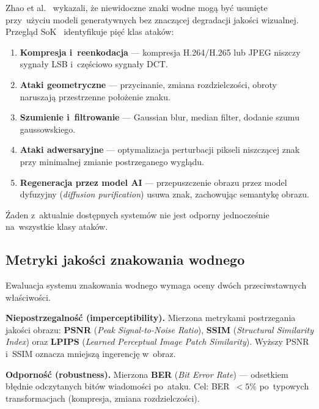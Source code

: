 Zhao et al.\ \cite{Zhao2023InvisibleRemovable} wykazali,
\.{z}e niewidoczne znaki wodne mog\k{a} by\'{c} usuni\k{e}te
przy~u\.{z}yciu modeli generatywnych bez znacz\k{a}cej
degradacji jako\'{s}ci wizualnej.
Przegl\k{a}d SoK~\cite{Piet2024SoKWatermarking}
identyfikuje pi\k{e}\'{c} klas atak\'{o}w:

\begin{enumerate}
  \item \textbf{Kompresja i~reenkodacja} --- kompresja
        H.264/H.265 lub JPEG niszczy sygna\l{}y LSB
        i~cz\k{e}\'{s}ciowo sygna\l{}y DCT.
  \item \textbf{Ataki geometryczne} --- przycinanie,
        zmiana rozdzielczo\'{s}ci, obroty naruszaj\k{a}
        przestrzenne po\l{}o\.{z}enie znaku.
  \item \textbf{Szumienie i~filtrowanie} ---
        Gaussian blur, median filter, dodanie szumu gaussowskiego.
  \item \textbf{Ataki adwersaryjne} --- optymalizacja
        perturbacji pikseli niszcz\k{a}cej znak
        przy minimalnej zmianie postrzeganego wygl\k{a}du.
  \item \textbf{Regeneracja przez model AI} ---
        przepuszczenie obrazu przez model dyfuzyjny
        (\textit{diffusion purification}) usuwa znak,
        zachowuj\k{a}c semantyk\k{e} obrazu.
\end{enumerate}

\noindent
\'{Z}aden z~aktualnie dost\k{e}pnych system\'{o}w nie jest
odporny jednocze\'{s}nie na~wszystkie klasy atak\'{o}w.

\subsection{Metryki jako\'{s}ci znakowania wodnego}
\label{sec:watermark_metrics}

Ewaluacja systemu znakowania wodnego wymaga oceny
dwóch przeciwstawnych w\l{}a\'{s}ciwo\'{s}ci.

\textbf{Niepostrzegalno\'{s}\'{c} (imperceptibility).}
Mierzona metrykami postrzegania jako\'{s}ci obrazu:
\textbf{PSNR} (\textit{Peak Signal-to-Noise Ratio}),
\textbf{SSIM} (\textit{Structural Similarity Index})
oraz \textbf{LPIPS} (\textit{Learned Perceptual Image Patch Similarity}).
Wy\.{z}szy PSNR i~SSIM oznacza mniejsz\k{a} ingerencj\k{e} w~obraz.

\textbf{Odporno\'{s}\'{c} (robustness).}
Mierzona \textbf{BER} (\textit{Bit Error Rate}) ---
odsetkiem b\l{}\k{e}dnie odczytanych bit\'{o}w wiadomo\'{s}ci po~ataku.
Cel: BER~$< 5\%$ po~typowych transformacjach
(kompresja, zmiana rozdzielczo\'{s}ci).

